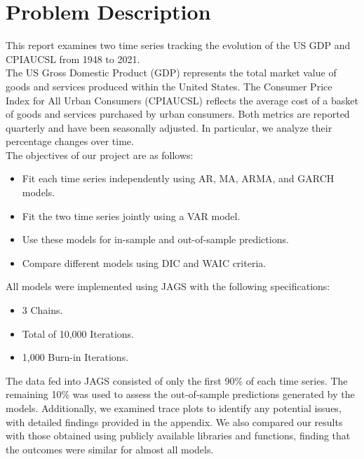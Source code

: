\section{Problem Description}
This report examines two time series tracking the evolution of the US GDP and CPIAUCSL from 1948 to 2021. \\
The US Gross Domestic Product (GDP) represents the total market value of goods and services produced within the United States. The Consumer Price Index for All Urban Consumers (CPIAUCSL) reflects the average cost of a basket of goods and services purchased by urban consumers. Both metrics are reported quarterly and have been seasonally adjusted. In particular, we analyze their percentage changes over time. \\
The objectives of our project are as follows:
\begin{itemize}
    \item Fit each time series independently using AR, MA, ARMA, and GARCH models.
    \item Fit the two time series jointly using a VAR model.
    \item Use these models for in-sample and out-of-sample predictions.
    \item Compare different models using DIC and WAIC criteria.
\end{itemize}
All models were implemented using JAGS with the following specifications:
\begin{itemize}
    \item 3 Chains.
    \item Total of 10,000 Iterations.
    \item 1,000 Burn-in Iterations.
\end{itemize}
The data fed into JAGS consisted of only the first 90\% of each time series. The remaining 10\% was used to assess the out-of-sample predictions generated by the models.
Additionally, we examined trace plots to identify any potential issues, with detailed findings provided in the appendix. We also compared our results with those obtained using publicly available libraries and functions, finding that the outcomes were similar for almost all models. \\